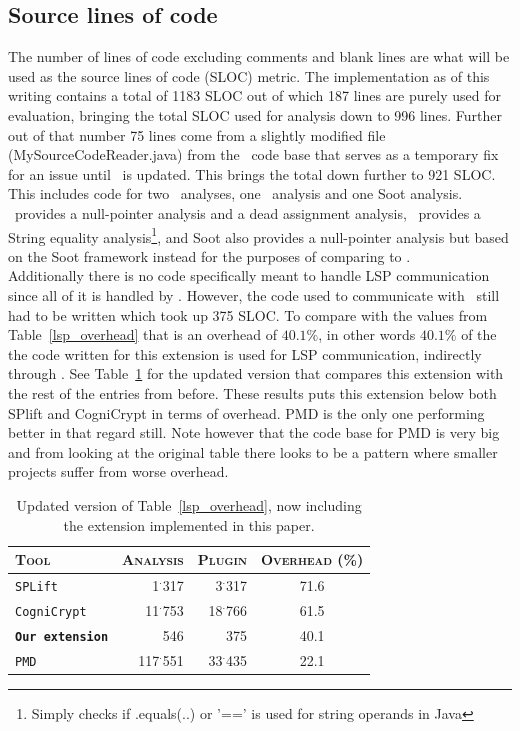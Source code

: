 \documentclass[sigplan,10pt]{acmart}
\begin{document}
\subsection{Source lines of code}
The number of lines of code excluding comments and blank lines are what will be used as the source lines of code (SLOC) metric. The implementation as of this writing contains a total of 1183 SLOC out of which 187 lines are purely used for evaluation, bringing the total SLOC used for analysis down to 996 lines. Further out of that number 75 lines come from a slightly modified file (MySourceCodeReader.java) from the \magpie\ code base that serves as a temporary fix for an issue until \magpie\ is updated. This brings the total down further to 921 SLOC. This includes code for two \intraj\ analyses, one \extendj\ analysis and one Soot analysis. \intraj\ provides a null-pointer analysis and a dead assignment analysis, \extendj\ provides a String equality analysis\footnote{Simply checks if .equals(..) or '==' is used for string operands in Java}, and Soot also provides a null-pointer analysis but based on the Soot framework instead for the purposes of comparing to \intraj.
\\
Additionally there is no code specifically meant to handle LSP communication since all of it is handled by \magpie. However, the code used to communicate with \magpie\ still had to be written which took up 375 SLOC. To compare with the values from Table~\ref{lsp_overhead} that is an overhead of $40.1\%$, in other words $40.1\%$ of the the code written for this extension is used for LSP communication, indirectly through \magpie. See Table~\ref{lsp_overhead2} for the updated version that compares this extension with the rest of the entries from before. These results puts this extension below both SPlift and CogniCrypt in terms of overhead. PMD is the only one performing better in that regard still. Note however that the code base for PMD is very big and from looking at the original table \cite{magpie} there looks to be a pattern where smaller projects suffer from worse overhead.

\begin{table}[h!]
\begin{tabularx}{\columnwidth}{brrc}
\toprule
\textsc{Tool} & \textsc{Analysis} & \textsc{Plugin} & \textsc{Overhead} (\%)\\ 
\midrule
 \texttt{SPLift} & 1$^\cdot$317 & 3$^\cdot$317 & 71.6\\
 \texttt{CogniCrypt} & 11$^\cdot$753 & 18$^\cdot$766 & 61.5\\
 \textbf{\texttt{Our extension}} & 546 & 375 & 40.1\\
 \texttt{PMD} & 117$^\cdot$551 & 33$^\cdot$435 & 22.1\\
\bottomrule
\end{tabularx}
 \caption{Updated version of Table~\ref{lsp_overhead}, now including the extension implemented in this paper.} 
 \label{lsp_overhead2}
\end{table}
\end{document}
